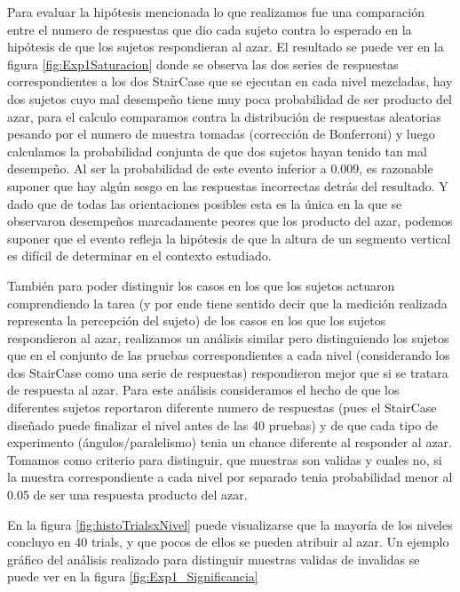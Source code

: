 \documentclass{article}
\begin{document}
    Para evaluar la hipótesis mencionada lo que realizamos fue una comparación entre el numero de respuestas que dio cada sujeto contra lo esperado en la hipótesis de que los sujetos respondieran al azar. El resultado se puede ver en la figura \ref{fig:Exp1Saturacion} donde se observa las dos series de respuestas correspondientes a los dos StairCase que se ejecutan en cada nivel mezcladas, hay dos sujetos cuyo mal desempeño tiene muy poca probabilidad de ser producto del azar, para el calculo comparamos contra la distribución de respuestas aleatorias pesando por el numero de muestra tomadas (corrección de Bonferroni) y luego calculamos la probabilidad conjunta de que dos sujetos hayan tenido tan mal desempeño. Al ser la probabilidad de este evento inferior a 0.009, es razonable suponer que hay algún sesgo en las respuestas incorrectas detrás del resultado. Y dado que de todas las orientaciones posibles esta es la única en la que se observaron desempeños marcadamente peores que los producto del azar, podemos suponer que el evento refleja la hipótesis de que la altura de un segmento vertical es difícil de determinar en el contexto estudiado.
    
    También para poder distinguir los casos en los que los sujetos actuaron comprendiendo la tarea (y por ende tiene sentido decir que la medición realizada representa la percepción del sujeto) de los casos en los que los sujetos respondieron al azar, realizamos un análisis similar pero distinguiendo los sujetos que en el conjunto de las pruebas correspondientes a cada nivel (considerando los dos StairCase como una serie de respuestas) respondieron mejor que si se tratara de respuesta al azar. Para este análisis consideramos el hecho de que los diferentes sujetos reportaron diferente numero de respuestas (pues el StairCase diseñado puede finalizar el nivel antes de las 40 pruebas) y de que cada tipo de experimento (ángulos/paralelismo) tenia un chance diferente al responder al azar. Tomamos como criterio para distinguir, que muestras son validas y cuales no, si la muestra correspondiente a cada nivel por separado tenia probabilidad menor al 0.05 de ser una respuesta producto del azar. 
    
    En la figura \ref{fig:histoTrialsxNivel} puede visualizarse que la mayoría de los niveles concluyo en 40 trials, y que pocos de ellos se pueden atribuir al azar. Un ejemplo gráfico del análisis realizado para distinguir muestras validas de invalidas se puede ver en la figura \ref{fig:Exp1_Significancia}
	
\end{document}
